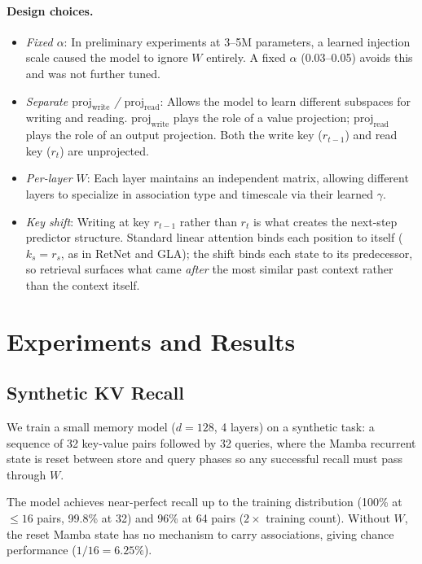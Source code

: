 \documentclass{article}
\begin{document}
\paragraph{Design choices.}
\begin{itemize}
    \item \textit{Fixed $\alpha$}: In preliminary experiments at 3--5M parameters, a learned injection scale caused the model to ignore $W$ entirely. A fixed $\alpha$ (0.03--0.05) avoids this and was not further tuned.
    \item \textit{Separate $\text{proj}_\text{write}$ / $\text{proj}_\text{read}$}: Allows the model to learn different subspaces for writing and reading. $\text{proj}_\text{write}$ plays the role of a value projection; $\text{proj}_\text{read}$ plays the role of an output projection. Both the write key ($r_{t-1}$) and read key ($r_t$) are unprojected.
    \item \textit{Per-layer $W$}: Each layer maintains an independent matrix, allowing different layers to specialize in association type and timescale via their learned $\gamma$.
    \item \textit{Key shift}: Writing at key $r_{t-1}$ rather than $r_t$ is what creates the next-step predictor structure. Standard linear attention binds each position to itself ($k_s = r_s$, as in RetNet and GLA); the shift binds each state to its predecessor, so retrieval surfaces what came \emph{after} the most similar past context rather than the context itself.
\end{itemize}

\section{Experiments and Results}

\FloatBarrier
\subsection{Synthetic KV Recall}
\label{sec:recall}

We train a small memory model ($d=128$, 4 layers) on a synthetic task: a sequence of 32 key-value pairs followed by 32 queries, where the Mamba recurrent state is reset between store and query phases so any successful recall must pass through $W$.

The model achieves near-perfect recall up to the training distribution (100\% at ${\leq}16$ pairs, 99.8\% at 32) and 96\% at 64 pairs ($2\times$ training count). Without $W$, the reset Mamba state has no mechanism to carry associations, giving chance performance ($1/16 = 6.25\%$).
\end{document}
